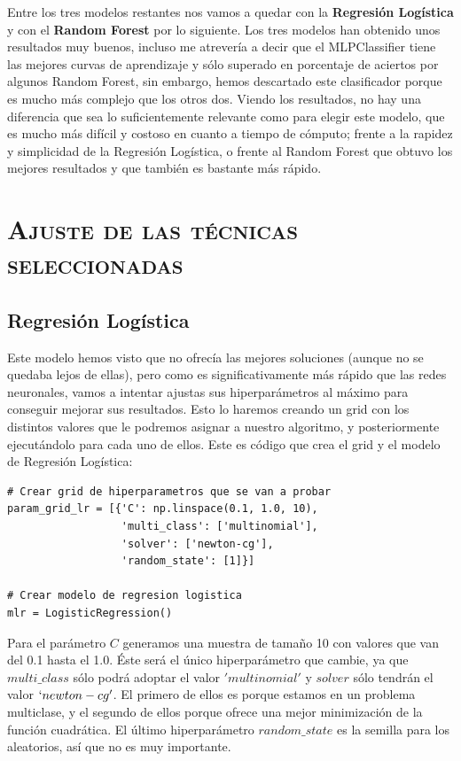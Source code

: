 \documentclass[11pt,a4paper]{article}
\begin{document}
Entre los tres modelos restantes nos vamos a quedar con la \textbf{Regresión Logística} y con el \textbf{Random Forest} por lo siguiente. Los tres modelos han obtenido unos resultados muy buenos, incluso me atrevería a decir que el MLPClassifier tiene las mejores curvas de aprendizaje y sólo superado en porcentaje de aciertos por algunos Random Forest, sin embargo, hemos descartado este clasificador porque es mucho más complejo que los otros dos. Viendo los resultados, no hay una diferencia que sea lo suficientemente relevante como para elegir este modelo, que es mucho más difícil y costoso en cuanto a tiempo de cómputo; frente a la rapidez y simplicidad de la Regresión Logística, o frente al Random Forest que obtuvo los mejores resultados y que también es bastante más rápido.

\section{\textsc{Ajuste de las técnicas seleccionadas}}

\subsection{Regresión Logística}

Este modelo hemos visto que no ofrecía las mejores soluciones (aunque no se quedaba lejos de ellas), pero como es significativamente más rápido que las redes neuronales, vamos a intentar ajustas sus hiperparámetros al máximo para conseguir mejorar sus resultados. Esto lo haremos creando un grid con los distintos valores que le podremos asignar a nuestro algoritmo, y posteriormente ejecutándolo para cada uno de ellos. Este es código que crea el grid y el modelo de Regresión Logística:

\begin{lstlisting}
# Crear grid de hiperparametros que se van a probar
param_grid_lr = [{'C': np.linspace(0.1, 1.0, 10),
                  'multi_class': ['multinomial'],
                  'solver': ['newton-cg'],
                  'random_state': [1]}]

# Crear modelo de regresion logistica
mlr = LogisticRegression()
\end{lstlisting}

Para el parámetro $C$ generamos una muestra de tamaño 10 con valores que van del 0.1 hasta el 1.0. Éste será el único hiperparámetro que cambie, ya que $multi\_class$ sólo podrá adoptar el valor $'multinomial'$ y $solver$ sólo tendrán el valor $`newton-cg'$. El primero de ellos es porque estamos en un problema multiclase, y el segundo de ellos porque ofrece una mejor minimización de la función cuadrática. El último hiperparámetro $random\_state$ es la semilla para los aleatorios, así que no es muy importante.
\end{document}
